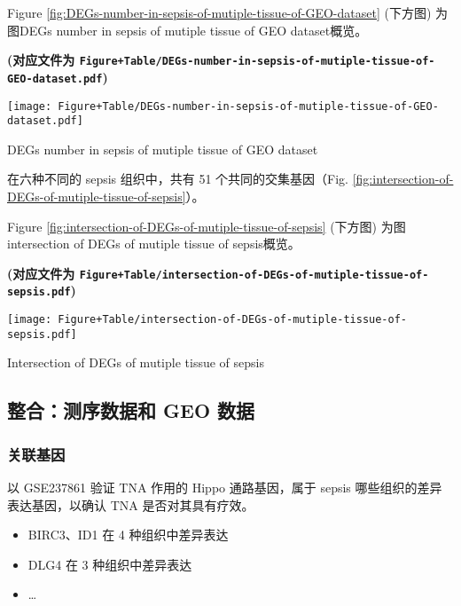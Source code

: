 \documentclass[
]{article}
\providecommand{\tightlist}{%
  \setlength{\itemsep}{0pt}\setlength{\parskip}{0pt}}
\begin{document}
Figure \ref{fig:DEGs-number-in-sepsis-of-mutiple-tissue-of-GEO-dataset} (下方图) 为图DEGs number in sepsis of mutiple tissue of GEO dataset概览。

\textbf{(对应文件为 \texttt{Figure+Table/DEGs-number-in-sepsis-of-mutiple-tissue-of-GEO-dataset.pdf})}

\def\@captype{figure}
\begin{center}
\texttt{[image: Figure+Table/DEGs-number-in-sepsis-of-mutiple-tissue-of-GEO-dataset.pdf]}
\caption{DEGs number in sepsis of mutiple tissue of GEO dataset}\label{fig:DEGs-number-in-sepsis-of-mutiple-tissue-of-GEO-dataset}
\end{center}

在六种不同的 sepsis 组织中，共有 51 个共同的交集基因（Fig. \ref{fig:intersection-of-DEGs-of-mutiple-tissue-of-sepsis}）。

Figure \ref{fig:intersection-of-DEGs-of-mutiple-tissue-of-sepsis} (下方图) 为图intersection of DEGs of mutiple tissue of sepsis概览。

\textbf{(对应文件为 \texttt{Figure+Table/intersection-of-DEGs-of-mutiple-tissue-of-sepsis.pdf})}

\def\@captype{figure}
\begin{center}
\texttt{[image: Figure+Table/intersection-of-DEGs-of-mutiple-tissue-of-sepsis.pdf]}
\caption{Intersection of DEGs of mutiple tissue of sepsis}\label{fig:intersection-of-DEGs-of-mutiple-tissue-of-sepsis}
\end{center}

\hypertarget{ux6574ux5408ux6d4bux5e8fux6570ux636eux548c-geo-ux6570ux636e}{%
\subsection{整合：测序数据和 GEO 数据}\label{ux6574ux5408ux6d4bux5e8fux6570ux636eux548c-geo-ux6570ux636e}}

\hypertarget{ux5173ux8054ux57faux56e0}{%
\subsubsection{关联基因}\label{ux5173ux8054ux57faux56e0}}

以 GSE237861 验证 TNA 作用的 Hippo 通路基因，属于 sepsis 哪些组织的差异表达基因，以确认 TNA 是否对其具有疗效。

\begin{itemize}
\tightlist
\item
  BIRC3、ID1 在 4 种组织中差异表达
\item
  DLG4 在 3 种组织中差异表达
\item
  \ldots{}
\end{itemize}
\end{document}
